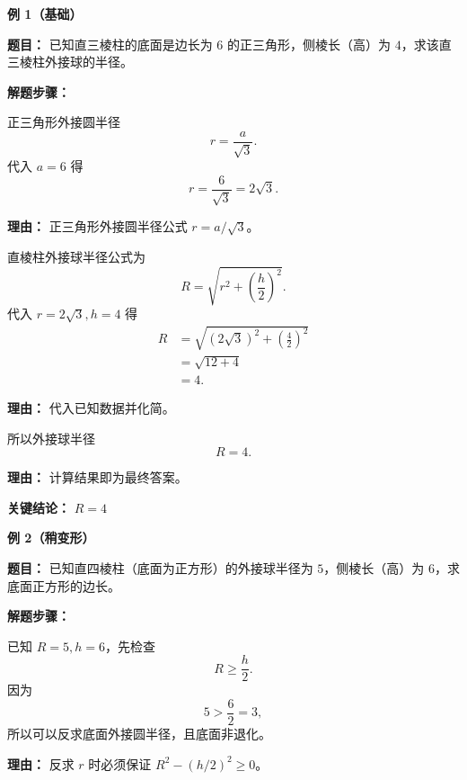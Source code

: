 \begin{examplebox}
	\textbf{\textcolor{CExample}{例 1（基础）}}

	\textbf{\textcolor{CExample}{题目：}} 已知直三棱柱的底面是边长为 $6$ 的正三角形，侧棱长（高）为 $4$，求该直三棱柱外接球的半径。

	\textbf{\textcolor{CExample}{解题步骤：}}
	\begin{description}[style=nextline, leftmargin=2.8em, labelsep=0.5em, itemsep=0.45em]
		\item[\textbf{第一步（求外接圆半径）：}]
		      正三角形外接圆半径
		      \[
			      r = \frac{a}{\sqrt{3}}.
		      \]
		      代入 $a=6$ 得
		      \[
			      r = \frac{6}{\sqrt{3}} = 2\sqrt{3}.
		      \]
		      \par\textbf{理由：} 正三角形外接圆半径公式 $r = a/\sqrt{3}$。

		\item[\textbf{第二步（代入外接球公式）：}]
		      直棱柱外接球半径公式为
		      \[
			      R = \sqrt{r^{2} + \left(\frac{h}{2}\right)^{2}}.
		      \]
		      代入 $r = 2\sqrt{3}, h=4$ 得
		      \[
			      \begin{aligned}
				      R & = \sqrt{(2\sqrt{3})^{2} + \left(\frac{4}{2}\right)^{2}} \\
				        & = \sqrt{12 + 4}                                         \\
				        & = 4.
			      \end{aligned}
		      \]
		      \par\textbf{理由：} 代入已知数据并化简。

		\item[\textbf{第三步（给出答案）：}]
		      所以外接球半径
		      \[
			      R = 4.
		      \]
		      \par\textbf{理由：} 计算结果即为最终答案。
	\end{description}

	\textbf{\textcolor{CExample}{关键结论：}} \textbf{$R = 4$}

	\medskip
	\textbf{\textcolor{CExample}{例 2（稍变形）}}

	\textbf{\textcolor{CExample}{题目：}} 已知直四棱柱（底面为正方形）的外接球半径为 $5$，侧棱长（高）为 $6$，求底面正方形的边长。

	\textbf{\textcolor{CExample}{解题步骤：}}
	\begin{description}[style=nextline, leftmargin=2.8em, labelsep=0.5em, itemsep=0.45em]
		\item[\textbf{第一步（检查存在性）：}]
		      已知 $R=5,h=6$，先检查
		      \[
			      R\geq \frac{h}{2}.
		      \]
		      因为
		      \[
			      5>\frac{6}{2}=3,
		      \]
		      所以可以反求底面外接圆半径，且底面非退化。
		      \par\textbf{理由：} 反求 $r$ 时必须保证 $R^2-(h/2)^2\geq 0$。


\end{description}
\end{examplebox}
